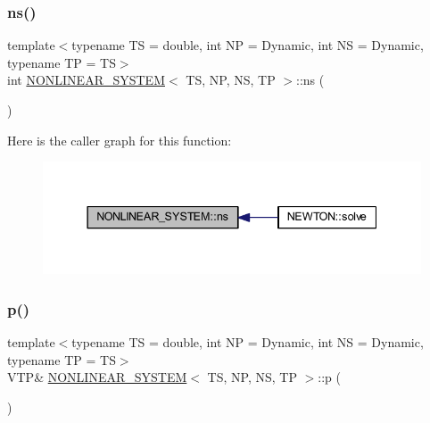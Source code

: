 \mbox{\label{class_n_o_n_l_i_n_e_a_r___s_y_s_t_e_m_abf4102c649f8316e44033a76f9d6183f}} 
\subsubsection{\texorpdfstring{ns()}{ns()}}
{\footnotesize\ttfamily template$<$typename TS = double, int NP = Dynamic, int NS = Dynamic, typename TP = TS$>$ \\
int \mbox{\hyperlink{class_n_o_n_l_i_n_e_a_r___s_y_s_t_e_m}{N\+O\+N\+L\+I\+N\+E\+A\+R\+\_\+\+S\+Y\+S\+T\+EM}}$<$ TS, NP, NS, TP $>$\+::ns (\begin{DoxyParamCaption}{ }\end{DoxyParamCaption})\hspace{0.3cm}{\ttfamily [inline]}}

Here is the caller graph for this function\+:
\nopagebreak
\begin{figure}[H]
\begin{center}
\leavevmode
\includegraphics[width=337pt]{class_n_o_n_l_i_n_e_a_r___s_y_s_t_e_m_abf4102c649f8316e44033a76f9d6183f_icgraph}
\end{center}
\end{figure}
\mbox{\label{class_n_o_n_l_i_n_e_a_r___s_y_s_t_e_m_a1536a98a6cb3fec681bdd3312ae43714}} 
\subsubsection{\texorpdfstring{p()}{p()}\hspace{0.1cm}{\footnotesize\ttfamily [1/2]}}
{\footnotesize\ttfamily template$<$typename TS = double, int NP = Dynamic, int NS = Dynamic, typename TP = TS$>$ \\
V\+TP\& \mbox{\hyperlink{class_n_o_n_l_i_n_e_a_r___s_y_s_t_e_m}{N\+O\+N\+L\+I\+N\+E\+A\+R\+\_\+\+S\+Y\+S\+T\+EM}}$<$ TS, NP, NS, TP $>$\+::p (\begin{DoxyParamCaption}{ }\end{DoxyParamCaption})\hspace{0.3cm}{\ttfamily [inline]}}

